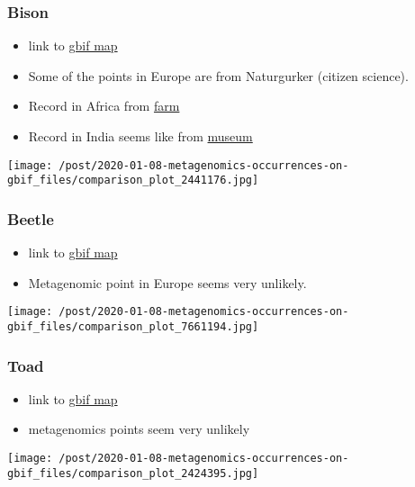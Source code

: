 \documentclass[]{article}
\providecommand{\tightlist}{%
  \setlength{\itemsep}{0pt}\setlength{\parskip}{0pt}}
\begin{document}
\hypertarget{bison}{%
\subsubsection{Bison}\label{bison}}

\begin{itemize}
\tightlist
\item
  link to
  \href{https://www.gbif.org/occurrence/map?taxon_key=2441176}{gbif map}
\item
  Some of the points in Europe are from Naturgurker (citizen science).
\item
  Record in Africa from
  \href{https://www.gbif.org/occurrence/1064936544}{farm}
\item
  Record in India seems like from
  \href{https://www.gbif.org/occurrence/1065408095}{museum}
\end{itemize}

\texttt{[image: /post/2020-01-08-metagenomics-occurrences-on-gbif\_files/comparison\_plot\_2441176.jpg]}

\hypertarget{beetle}{%
\subsubsection{Beetle}\label{beetle}}

\begin{itemize}
\tightlist
\item
  link to
  \href{https://www.gbif.org/occurrence/map?taxon_key=7661194}{gbif map}
\item
  {Metagenomic point} in Europe seems very unlikely.
\end{itemize}

\texttt{[image: /post/2020-01-08-metagenomics-occurrences-on-gbif\_files/comparison\_plot\_7661194.jpg]}

\hypertarget{toad}{%
\subsubsection{Toad}\label{toad}}

\begin{itemize}
\tightlist
\item
  link to
  \href{https://www.gbif.org/occurrence/map?taxon_key=2424395}{gbif map}
\item
  {metagenomics points} seem very unlikely
\end{itemize}

\texttt{[image: /post/2020-01-08-metagenomics-occurrences-on-gbif\_files/comparison\_plot\_2424395.jpg]}
\end{document}
